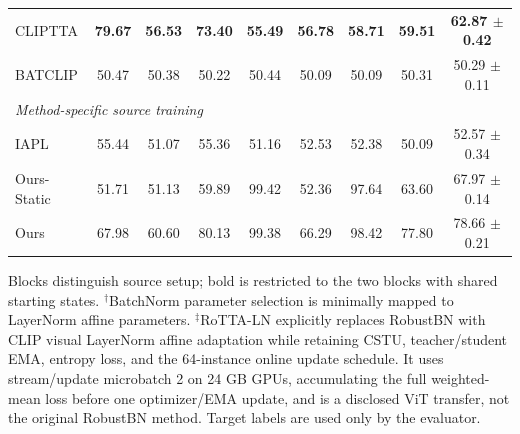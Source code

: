 \begin{table}[t]
{\begin{tabular}{lcccccccc}
CLIPTTA & \textbf{79.67} & \textbf{56.53} & \textbf{73.40} & \textbf{55.49} & \textbf{56.78} & \textbf{58.71} & \textbf{59.51} & \textbf{62.87 $\pm$ 0.42} \\
BATCLIP & 50.47 & 50.38 & 50.22 & 50.44 & 50.09 & 50.09 & 50.31 & 50.29 $\pm$ 0.11 \\
\midrule
\multicolumn{9}{l}{\textit{Method-specific source training}} \\
IAPL & 55.44 & 51.07 & 55.36 & 51.16 & 52.53 & 52.38 & 50.09 & 52.57 $\pm$ 0.34 \\
Ours-Static & 51.71 & 51.13 & 59.89 & 99.42 & 52.36 & 97.64 & 63.60 & 67.97 $\pm$ 0.14 \\
Ours & 67.98 & 60.60 & 80.13 & 99.38 & 66.29 & 98.42 & 77.80 & 78.66 $\pm$ 0.21 \\
\bottomrule
\end{tabular}%
}
\vspace{2pt}
\parbox{\textwidth}{\footnotesize Blocks distinguish source setup; bold is restricted to the two blocks with shared starting states. $^{\dagger}$BatchNorm parameter selection is minimally mapped to LayerNorm affine parameters. $^{\ddagger}$RoTTA-LN explicitly replaces RobustBN with CLIP visual LayerNorm affine adaptation while retaining CSTU, teacher/student EMA, entropy loss, and the 64-instance online update schedule. It uses stream/update microbatch 2 on 24 GB GPUs, accumulating the full weighted-mean loss before one optimizer/EMA update, and is a disclosed ViT transfer, not the original RobustBN method. Target labels are used only by the evaluator.}
\end{table}
